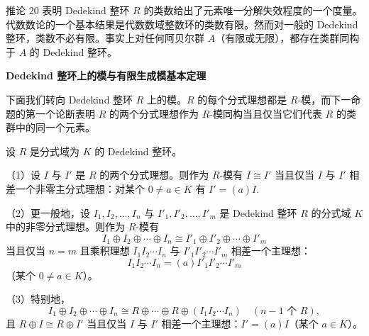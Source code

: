 推论 20 表明 Dedekind 整环 \(R\) 的类数给出了元素唯一分解失效程度的一个度量。代数数论的一个基本结果是代数数域整数环的类数有限。然而对一般的 Dedekind 整环，类数不必有限。事实上对任何阿贝尔群 \(A\)（有限或无限），都存在类群同构于 \(A\) 的 Dedekind 整环。

\noindent\textbf{Dedekind 整环上的模与有限生成模基本定理}

下面我们转向 Dedekind 整环 \(R\) 上的模。\(R\) 的每个分式理想都是 \(R\)-模，而下一命题的第一个论断表明 \(R\) 的两个分式理想作为 \(R\)-模同构当且仅当它们代表 \(R\) 的类群中的同一个元素。

\begin{proposition}\label{pro:16.21}
设 \(R\) 是分式域为 \(K\) 的 Dedekind 整环。

（1）设 \(I\) 与 \(I'\) 是 \(R\) 的两个分式理想。则作为 \(R\)-模有 \(I \cong I'\) 当且仅当 \(I\) 与 \(I'\) 相差一个非零主分式理想：对某个 \(0 \neq a \in K\) 有 \(I' = (a)I\).

（2）更一般地，设 \(I_1, I_2, \ldots, I_n\) 与 \(I'_1, I'_2, \ldots, I'_m\) 是 Dedekind 整环 \(R\) 的分式域 \(K\) 中的非零分式理想。则作为 \(R\)-模有
\[
I_1 \oplus I_2 \oplus \cdots \oplus I_n \cong I'_1 \oplus I'_2 \oplus \cdots \oplus I'_m
\]
当且仅当 \(n = m\) 且乘积理想 \(I_1I_2\cdots I_n\) 与 \(I'_1I'_2\cdots I'_m\) 相差一个主理想：
\[
I_1I_2\cdots I_n = (a)I'_1I'_2\cdots I'_m
\]
（某个 \(0 \neq a \in K\)）。

（3）特别地，
\[
I_1 \oplus I_2 \oplus \cdots \oplus I_n \cong R \oplus \cdots \oplus R \oplus (I_1I_2\cdots I_n) \quad (\text{\(n-1\) 个 \(R\)}),
\]
且 \(R \oplus I \cong R \oplus I'\) 当且仅当 \(I\) 与 \(I'\) 相差一个主理想：\(I' = (a)I\)（某个 \(a \in K\)）。
\end{proposition}

